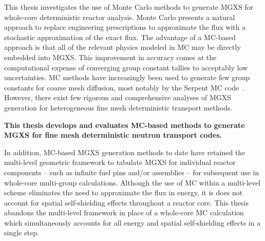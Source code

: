 
This thesis investigates the use of Monte Carlo methods to generate \ac{MGXS} for whole-core deterministic reactor analysis. Monte Carlo presents a natural approach to replace engineering prescriptions to approximate the flux with a stochastic approximation of the exact flux. The advantage of a \ac{MC}-based approach is that all of the relevant physics modeled in \ac{MC} may be directly embedded into \ac{MGXS}. This improvement in accuracy comes at the computational expense of converging group constant tallies to acceptably low uncertainties. \ac{MC} methods have increasingly been used to generate few group constants for coarse mesh diffusion, most notably by the Serpent \ac{MC} code~\cite{serpent2013manual}. However, there exist few rigorous and comprehensive analyses of \ac{MGXS} generation for heterogeneous fine mesh deterministic transport methods. 

\begin{emphbox}
\textbf{This thesis develops and evaluates \ac{MC}-based methods to generate \ac{MGXS} for fine mesh deterministic neutron transport codes.}
\end{emphbox}

\vspace{-0.1in}

In addition, \ac{MC}-based \ac{MGXS} generation methods to date have retained the multi-level geometric framework to tabulate \ac{MGXS} for individual reactor components -- such as infinite fuel pins and/or assemblies -- for subsequent use in whole-core multi-group calculations. Although the use of \ac{MC} within a multi-level scheme eliminates the need to approximate the flux in energy, it is does not account for spatial self-shielding effects throughout a reactor core. This thesis abandons the multi-level framework in place of a whole-core \ac{MC} calculation which simultaneously accounts for all energy and spatial self-shielding effects in a single step.


